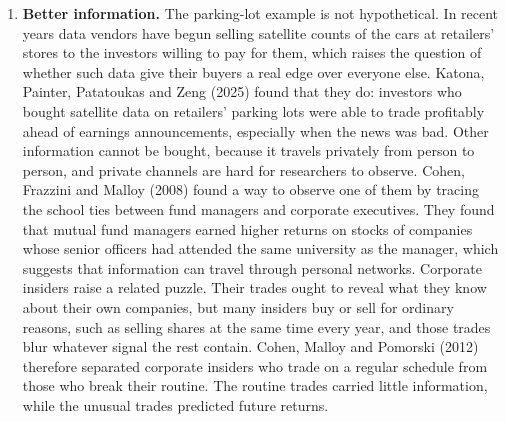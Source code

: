 \begin{itemize}
  \begin{enumerate}
    \item \textbf{Better information.} The parking-lot example is not hypothetical.
  In recent years data vendors have begun selling satellite counts of the cars
  at retailers' stores to the investors willing to pay for them, which raises
  the question of whether such data give their buyers a real edge over
  everyone else. Katona, Painter, Patatoukas and Zeng (2025) found that they
  do: investors who bought satellite data on retailers' parking lots were
  able to trade profitably ahead of earnings announcements, especially when
  the news was bad. Other information cannot be bought, because it travels
  privately from person to person, and private channels are hard for
  researchers to observe. Cohen, Frazzini and Malloy (2008) found a way to
  observe one of them by tracing the school ties between fund managers and
  corporate executives. They found that mutual fund managers earned higher
  returns on stocks of companies whose senior officers had attended the same
  university as the manager, which suggests that information can travel
  through personal networks. Corporate insiders raise a related puzzle. Their
  trades ought to reveal what they know about their own companies, but many
  insiders buy or sell for ordinary reasons, such as selling shares at the
  same time every year, and those trades blur whatever signal the rest
  contain. Cohen, Malloy and Pomorski (2012) therefore separated corporate
  insiders who trade on a regular schedule from those who break their
  routine. The routine trades carried little information, while the unusual
  trades predicted future returns.


\end{enumerate}
\end{itemize}
